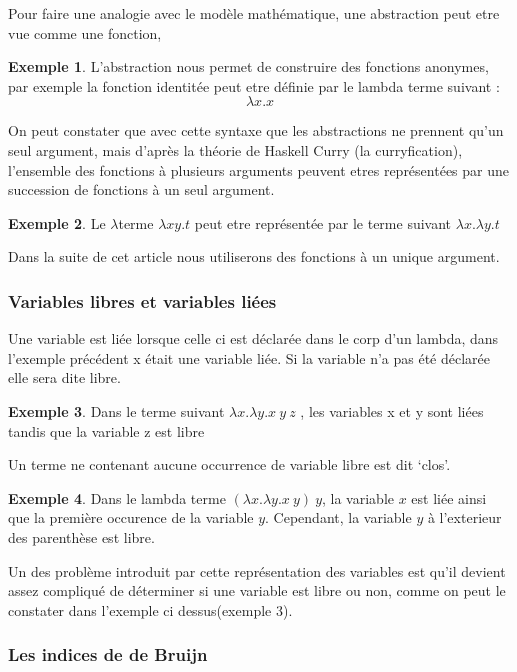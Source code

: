 \documentclass {article}
\theoremstyle{definition}
\newtheorem{example}{Exemple}
\theoremstyle{remark}
\begin{document}
Pour faire une analogie avec le modèle mathématique, une abstraction peut 
etre vue comme une fonction,

\begin{example}
  L'abstraction nous permet de construire des fonctions anonymes, par exemple la
  fonction identitée peut etre définie par le lambda terme suivant :
  \[ 
  \lambda x. x
  \]
\end{example}

On peut constater que avec cette syntaxe que les abstractions ne prennent qu'un
seul argument, mais d'après la théorie de Haskell Curry (la curryfication), 
l'ensemble des fonctions à plusieurs arguments peuvent etres représentées 
par une succession de fonctions à un seul argument.
\begin{example}
Le \(\lambda\)terme  \(\lambda xy.t\) peut etre représentée par le terme suivant
\(\lambda x.\lambda y.t\)   
\end{example} 
Dans la suite de cet article nous utiliserons des fonctions à un unique 
argument. 

\subsubsection{Variables libres et variables liées}

Une variable est liée lorsque celle ci est déclarée dans le corp d'un lambda, 
dans l'exemple précédent x était une variable liée. 
Si la variable n'a pas été déclarée elle sera dite libre. 

\begin{example}
  Dans le terme suivant \(\lambda x.\lambda y.x\:y\:z\) , les variables x et 
  y sont liées tandis que la variable z est libre 
\end{example}

Un terme ne contenant aucune occurrence de variable libre est dit `clos'.
\begin{example}
  Dans le lambda terme \((\lambda x. \lambda y. x\: y)\: y\), la
  variable \(x\) est liée ainsi que la première occurence de la
  variable \(y\). Cependant, la variable \(y\) à l'exterieur des
  parenthèse est libre.
\end{example}

Un des problème introduit par cette représentation des variables est qu'il devient assez compliqué de déterminer si une variable est libre ou non, comme on peut le constater dans l'exemple ci dessus(exemple 3).  

\subsubsection{Les indices de de Bruijn}
\end{document}
